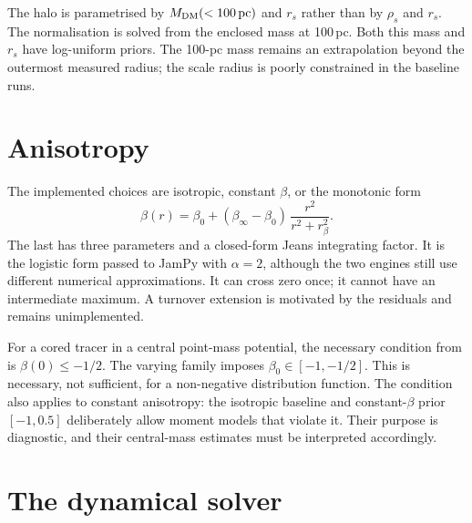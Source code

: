 \documentclass[11pt,a4paper]{article}
\begin{document}
The halo is parametrised by $M_{\rm DM}(<100\,\mathrm{pc})$ and $r_s$ rather than by $\rho_s$
and $r_s$. The normalisation is solved from the enclosed mass at 100\,pc. Both this mass and $r_s$
have log-uniform priors. The 100-pc mass remains an extrapolation beyond the outermost
measured radius; the scale radius is poorly constrained in the baseline runs.

\section{Anisotropy}

The implemented choices are isotropic, constant $\beta$, or the monotonic form
\begin{equation}
\beta(r) = \beta_0 + (\beta_\infty-\beta_0)\,\frac{r^2}{r^2+r_\beta^2}.
\end{equation}
The last has three parameters and a closed-form Jeans integrating factor. It is the
logistic form passed to JamPy with $\alpha=2$, although the two engines still use different
numerical approximations. It can cross zero once; it cannot have an intermediate maximum.
A turnover extension is motivated by the residuals and remains unimplemented.

For a cored tracer in a central point-mass potential, the necessary condition from
\citet{anevans2006} is $\beta(0)\le-1/2$. The varying family imposes
$\beta_0\in[-1,-1/2]$. This is necessary, not sufficient, for a non-negative distribution
function. The condition also applies to constant anisotropy: the isotropic baseline and
constant-$\beta$ prior $[-1,0.5]$ deliberately allow moment models that violate it. Their
purpose is diagnostic, and their central-mass estimates must be interpreted accordingly.

\section{The dynamical solver}
\end{document}
